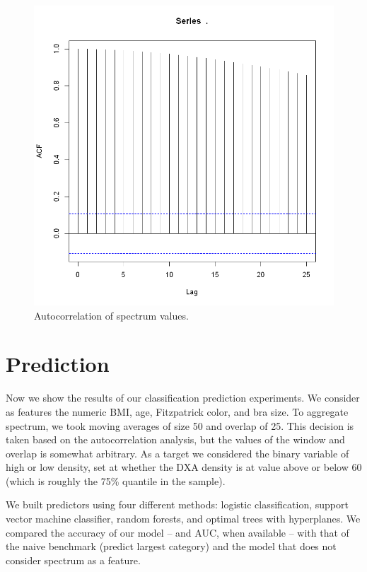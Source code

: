 \documentclass[letterpaper,11pt]{article}
\begin{document}
\begin{figure}[!htb]
	\centering
	\includegraphics[trim={0 0cm 0cm 0}, clip, scale=0.55]{figures/spectrum_ac.png}
	\caption{Autocorrelation of spectrum values.} 
	\label{fig:spectrum_ac}
\end{figure}


\section*{Prediction}
Now we show the results of our classification prediction experiments. We consider as features the numeric BMI, age, Fitzpatrick color, and bra size. To aggregate spectrum, we took moving averages of size 50 and overlap of 25. This decision is taken based on the autocorrelation analysis, but the values of the window and overlap is somewhat arbitrary. As a target we considered the binary variable of high or low density, set at whether the DXA density is at value above or below 60 (which is roughly the 75\% quantile in the sample).

We built predictors using four different methods: logistic classification, support vector machine classifier, random forests, and optimal trees with hyperplanes. We compared the accuracy of our model -- and AUC, when available -- with that of the naive benchmark (predict largest category) and the model that does not consider spectrum as a feature. 
\end{document}
